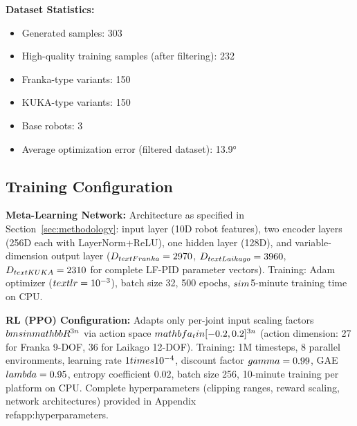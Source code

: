 \documentclass[DTMColor]{ROB-New}
\begin{document}
\textbf{Dataset Statistics:}
\begin{itemize}
    \item Generated samples: 303
    \item High-quality training samples (after filtering): 232
    \item Franka-type variants: 150
    \item KUKA-type variants: 150
    \item Base robots: 3
    \item Average optimization error (filtered dataset): 13.9°
\end{itemize}

\subsection{Training Configuration}

\textbf{Meta-Learning Network:} Architecture as specified in Section~\ref{sec:methodology}: input layer (10D robot features), two encoder layers (256D each with LayerNorm+ReLU), one hidden layer (128D), and variable-dimension output layer ($D_{\\text{Franka}}=2970$, $D_{\\text{Laikago}}=3960$, $D_{\\text{KUKA}}=2310$ for complete LF-PID parameter vectors). Training: Adam optimizer ($\\text{lr}=10^{-3}$), batch size 32, 500 epochs, $\\sim$5-minute training time on CPU.

\textbf{RL (PPO) Configuration:} Adapts only per-joint input scaling factors $\\bm{s} \\in \\mathbb{R}^{3n}$ via action space $\\mathbf{a}_t \\in [-0.2, 0.2]^{3n}$ (action dimension: 27 for Franka 9-DOF, 36 for Laikago 12-DOF). Training: 1M timesteps, 8 parallel environments, learning rate $1 \\times 10^{-4}$, discount factor $\\gamma=0.99$, GAE $\\lambda=0.95$, entropy coefficient $0.02$, batch size 256, 10-minute training per platform on CPU. Complete hyperparameters (clipping ranges, reward scaling, network architectures) provided in Appendix~\\ref{app:hyperparameters}.
\end{document}
